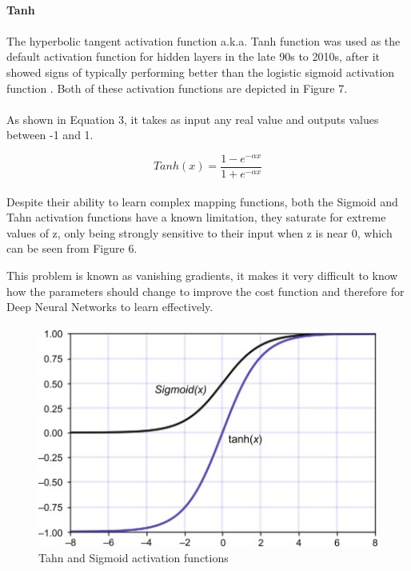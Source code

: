\documentclass{article}
\begin{document}
\paragraph{Tanh}
\paragraph{}
The hyperbolic tangent activation function a.k.a. Tanh function was used as the default activation function for hidden layers in the late 90s to 2010s, after it showed signs of typically performing better than the logistic sigmoid activation function \cite{GoodBengCour16}.
Both of these activation functions are depicted in Figure 7.
\paragraph{}
As shown in Equation 3, it takes as input any real value and outputs values between -1 and 1.

\begin{equation}
    Tanh(x) = \frac{1 - e^{-\alpha x}}{1 + e^{-\alpha x}} 
\end{equation}
\paragraph{}
Despite their ability to learn complex mapping functions, both the Sigmoid and Tahn activation functions have a known limitation, they saturate for extreme values of z, only being strongly sensitive to their input when z is near 0, which can be seen from Figure 6. 

This problem is known as vanishing gradients, it makes it very difficult to know how the parameters should change to improve the cost function \cite{GoodBengCour16} and therefore for Deep Neural Networks to learn effectively.
\paragraph{}
\begin{figure}[hbt!]
    \centering
    \includegraphics[width=0.5\linewidth]{tahn sigmoid funciton.jpg}
    \caption{Tahn and Sigmoid activation functions \cite{tahnfunc}}

\end{figure}
\end{document}
